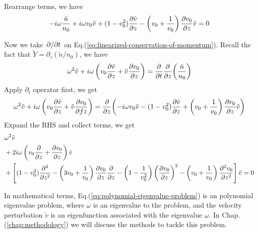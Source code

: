 Rearrange terms, we have
\[
	-i\omega\frac{\tilde{n}}{n_0} 
	+ i\omega v_0\tilde{v}
	+ (1-v_0^2)\pdv{\tilde{v}}{z} 
	- \left(v_0+\frac{1}{v_0}\right)\pdv{v_0}{z}\tilde{v} = 0	
\]

Now we take $\pdv*{t}$ on Eq.(\ref{eq:linearized-conservation-of-momentum}). Recall the fact that $\tilde{Y} = \partial_z(\tilde{n}/n_0)$, we have
\[ 
	\omega^2\tilde{v} + i\omega\left(v_0\pdv{\tilde{v}}{z} + \tilde{v}\pdv{v_0}{z}\right) 
	= \pdv{t}\pdv{z}(\frac{\tilde{n}}{n_0}) 
\]
Apply $\partial_t$ operator first, we get
\[ 
	\omega^2\tilde{v} + i\omega\left(v_0\pdv{\tilde{v}}{z} + \tilde{v}\pdv{v_0}{fz}\right) 
	= \pdv{z}(-i\omega v_0\tilde{v}
	- (1-v_0^2)\pdv{\tilde{v}}{z} 
	+ \left(v_0+\frac{1}{v_0}\right)\pdv{v_0}{z}\tilde{v})	
\]
Expand the RHS and collect terms, we get
\begin{equation} \label{eq:polynomial-eigenvalue-problem}
	\begin{aligned}
		&\omega^2 \tilde{v} \\ 
		&+2i\omega\left(v_0\pdv{}{z} + \pdv{v_0}{z}\right) \tilde{v} \\ 
		&+\left[ (1-v_0^2)\pdv[2]{}{z} 
		-\left(3v_0 + \frac{1}{v_0}\right)\pdv{v_0}{z}\pdv{}{z} 
		- \left(1-\frac{1}{v_0^2}\right)\left(\pdv{v_0}{z}\right)^2 
		- \left(v_0+\frac{1}{v_0}\right)\pdv[2]{v_0}{z} \right]\tilde{v}
		= 0
	\end{aligned}
\end{equation}

In mathematical terms, Eq.(\ref{eq:polynomial-eigenvalue-problem}) is an polynomial eigenvalue problem, where $\omega$ is an eigenvalue to the problem, and the velocity perturbation $\tilde{v}$ is an eigenfunction associated with the eigenvalue $\omega$. In Chap.(\ref{chap:methodology}) we will discuss the methods to tackle this problem.
